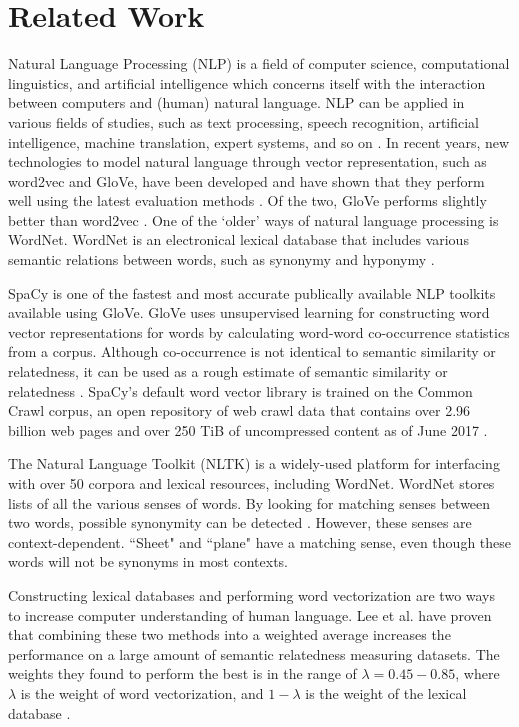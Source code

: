 \documentclass{article}
\begin{document}
\section{Related Work}

Natural Language Processing (NLP) is a field of computer science, computational linguistics, and artificial intelligence which concerns itself with the interaction between computers and (human) natural language. NLP can be applied in various fields of studies, such as text processing, speech recognition, artificial intelligence, machine translation, expert systems, and so on \citep{chowdhury2003natural}. 
In recent years, new technologies to model natural language through vector representation, such as word2vec and GloVe, have been developed \citep{mikolov2013efficient, pennington2014glove} and have shown that they perform well using the latest evaluation methods \citep{schnabel2015evaluation}. Of the two, GloVe performs slightly better than word2vec \citep{lee2016combining}.
One of the `older' ways of natural language processing is WordNet. WordNet is an electronical lexical database that includes various semantic relations between words, such as synonymy and hyponymy \citep{kilgarriff2000wordnet}.

SpaCy is one of the fastest and most accurate publically available NLP toolkits available \citep{choi2015depends} using GloVe. GloVe uses unsupervised learning for constructing word vector representations for words by calculating word-word co-occurrence statistics from a corpus. Although co-occurrence is not identical to semantic similarity or relatedness, it can be used as a rough estimate of semantic similarity or relatedness \citep{levy2015improving}. SpaCy's default word vector library is trained on the Common Crawl corpus, an open repository of web crawl data that contains over 2.96 billion web pages and over 250 TiB of uncompressed content as of June 2017 \citep{nagel2017commoncrawl}.

The Natural Language Toolkit (NLTK) is a widely-used platform for interfacing with over 50 corpora and lexical resources, including WordNet. WordNet stores lists of all the various senses of words. By looking for matching senses between two words, possible synonymity can be detected \cite{kilgarriff2000wordnet}. However, these senses are context-dependent. ``Sheet" and ``plane" have a matching sense, even though these words will not be synonyms in most contexts.

Constructing lexical databases and performing word vectorization are two ways to increase computer understanding of human language. Lee et al. have proven that combining these two methods into a weighted average increases the performance on a large amount of semantic relatedness measuring datasets. The weights they found to perform the best is in the range of $\lambda = 0.45-0.85$, where $\lambda$ is the weight of word vectorization, and $1-\lambda$ is the weight of the lexical database \cite{lee2016combining}.
\end{document}
